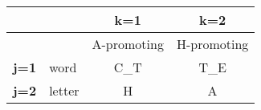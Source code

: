 \documentclass[english,man]{apa6}
\begin{document}
\begin{longtable}[c]{@{}clcc@{}}
\toprule
\begin{minipage}[b]{0.12\columnwidth}\centering\strut
~
\strut\end{minipage} &
\begin{minipage}[b]{0.09\columnwidth}\raggedright\strut
\strut\end{minipage} &
\begin{minipage}[b]{0.15\columnwidth}\centering\strut
k=1
\strut\end{minipage} &
\begin{minipage}[b]{0.15\columnwidth}\centering\strut
k=2
\strut\end{minipage}\tabularnewline
\midrule
\endhead
\begin{minipage}[t]{0.12\columnwidth}\centering\strut
\strut\end{minipage} &
\begin{minipage}[t]{0.09\columnwidth}\raggedright\strut
\strut\end{minipage} &
\begin{minipage}[t]{0.15\columnwidth}\centering\strut
A-promoting
\strut\end{minipage} &
\begin{minipage}[t]{0.15\columnwidth}\centering\strut
H-promoting
\strut\end{minipage}\tabularnewline
\begin{minipage}[t]{0.12\columnwidth}\centering\strut
\textbf{j=1}
\strut\end{minipage} &
\begin{minipage}[t]{0.09\columnwidth}\raggedright\strut
word
\strut\end{minipage} &
\begin{minipage}[t]{0.15\columnwidth}\centering\strut
C\_T
\strut\end{minipage} &
\begin{minipage}[t]{0.15\columnwidth}\centering\strut
T\_E
\strut\end{minipage}\tabularnewline
\begin{minipage}[t]{0.12\columnwidth}\centering\strut
\textbf{j=2}
\strut\end{minipage} &
\begin{minipage}[t]{0.09\columnwidth}\raggedright\strut
letter
\strut\end{minipage} &
\begin{minipage}[t]{0.15\columnwidth}\centering\strut
H
\strut\end{minipage} &
\begin{minipage}[t]{0.15\columnwidth}\centering\strut
A
\strut\end{minipage}\tabularnewline
\bottomrule
\end{longtable}
\end{document}
